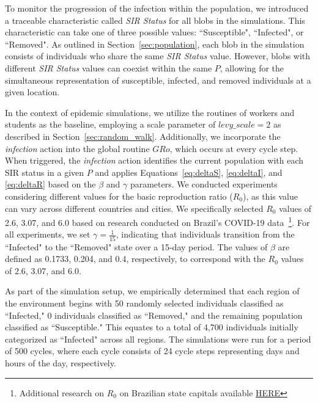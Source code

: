 \documentclass[pdflatex,sn-mathphys-num]{sn-jnl}%
\theoremstyle{thmstyleone}%
\theoremstyle{thmstyletwo}%
\theoremstyle{thmstylethree}%
\begin{document}
To monitor the progression of the infection within the population, we introduced a traceable characteristic called \textit{SIR Status} for all blobs in the simulations. This characteristic can take one of three possible values: ``Susceptible", ``Infected", or ``Removed". As outlined in Section~\ref{sec:population}, each blob in the simulation consists of individuals who share the same \textit{SIR Status} value. However, blobs with different \textit{SIR Status} values can coexist within the same $P$, allowing for the simultaneous representation of susceptible, infected, and removed individuals at a given location.

In the context of epidemic simulations, we utilize the routines of workers and students as the baseline, employing a scale parameter of $levy\_scale = 2$ as described in Section~\ref{sec:random_walk}. Additionally, we incorporate the \textit{infection} action into the global routine $GRo$, which occurs at every cycle step. When triggered, the \textit{infection} action identifies the current population with each SIR status in a given $P$ and applies Equations~\ref{eq:deltaS}, \ref{eq:deltaI}, and \ref{eq:deltaR} based on the $\beta$ and $\gamma$ parameters. We conducted experiments considering different values for the basic reproduction ratio ($R_0$), as this value can vary across different countries and cities. We specifically selected $R_0$ values of 2.6, 3.07, and 6.0 based on research conducted on Brazil's COVID-19 data~\citep{dutra2020covidR0, deSouza2020covirR0, dutra2021covidR0}\footnote{Additional research on $R_0$ on Brazilian state capitals available \href{https://www.blogs.unicamp.br/meiodecultura/2022/01/09/covid-19-e-rt-unico/}{HERE}
}.
For all experiments, we set $\gamma = {\frac{1}{15}}$, indicating that individuals transition from the ``Infected" to the ``Removed" state over a 15-day period. The values of $\beta$ are defined as 0.1733, 0.204, and 0.4, respectively, to correspond with the $R_0$ values of 2.6, 3.07, and 6.0. 

As part of the simulation setup, we empirically determined that each region of the environment begins with 50 randomly selected individuals classified as ``Infected," 0 individuals classified as ``Removed," and the remaining population classified as ``Susceptible." This equates to a total of 4,700 individuals initially categorized as ``Infected" across all regions.
The simulations were run for a period of 500 cycles, where each cycle consists of 24 cycle steps representing days and hours of the day, respectively. 
\end{document}
